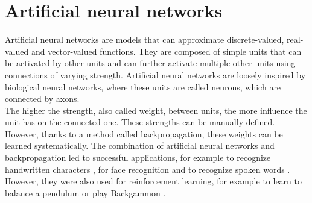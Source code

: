 \section{Artificial neural networks} %
\label{sec:artificial_neural_networks}
Artificial neural networks are models that can approximate discrete-valued, real-valued and vector-valued functions.
They are composed of simple units that can be activated by other units and can further activate multiple other units using connections of varying strength.
Artificial neural networks are loosely inspired by biological neural networks, where these units are called neurons, which are connected by axons.\\
The higher the strength, also called weight, between units, the more influence the unit has on the connected one. These strengths can be manually defined. However, thanks to a method called backpropagation, these weights can be learned systematically.
The combination of artificial neural networks and backpropagation led to successful applications, for example to recognize handwritten characters \citep{journals/neco/LeCunBDHHHJ89}, for face recognition \citep{cottrell1990extracting} and to recognize spoken words \citep{journals/nn/LangWH90}.
However, they were also used for reinforcement learning, for example to learn to balance a pendulum \citep{anderson:ieeecsm89} or play Backgammon \citep{Tesauro:92}.

